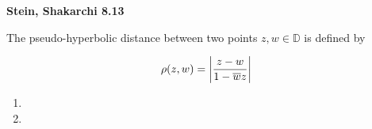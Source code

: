 \textbf{Stein, Shakarchi 8.13}

The pseudo-hyperbolic distance between two points $z, w \in \mathbb{D}$ is defined by

$$
\rho(z, w) = \left| \frac{z - w}{1 - \overline{w}{z}} \right|
$$

\begin{enumerate}
  \item 
  \pagebreak
  \item 
\end{enumerate}
